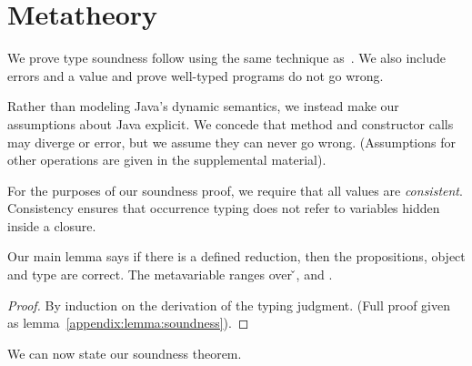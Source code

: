 \section{Metatheory}
\label{sec:metatheory}

We prove type soundness follow using the same technique as~\citet{TF10}. 
We also include errors and a \wrong{} value and prove
well-typed programs do not go wrong.

Rather than modeling Java's dynamic semantics, we instead
make our assumptions about Java explicit. We concede that
method and constructor calls may diverge or error, but we assume they can
never go wrong. (Assumptions for other operations are given in the supplemental
material).

{}





For the purposes of our soundness proof, we require that all values
are \emph{consistent}.
Consistency
ensures that occurrence typing does not refer to variables
hidden inside a closure.

{}

Our main lemma says if there is a defined reduction, then the propositions, object
and type are correct.
The metavariable  ranges over \v{}, \errorvalv{} and \wrong{}.

\begin{lemma}\label{main:lemma:soundness}

  {\soundnesslemmahypothesis}
  \begin{proof}
    By induction on the derivation of the typing judgment. 
    (Full proof given as lemma~\ref{appendix:lemma:soundness}).
  \end{proof}
\end{lemma}


We can now state our soundness theorem.

{}

{}
%
